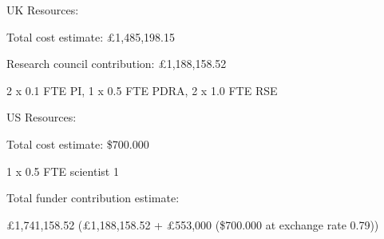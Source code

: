 
UK Resources:

Total cost estimate: £1,485,198.15

Research council contribution: £1,188,158.52

2 x 0.1 FTE PI, 1 x 0.5 FTE PDRA, 2 x 1.0 FTE RSE

\vspace{0.1in}
US Resources:

Total cost estimate: \$700.000

1 x 0.5 FTE scientist 1

\vspace{0.1in}
Total funder contribution estimate:

£1,741,158.52 (£1,188,158.52 + £553,000 (\$700.000 at exchange rate 0.79))

